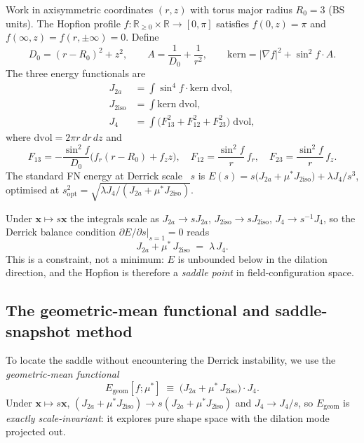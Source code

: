 \documentclass[11pt,a4paper]{article}
\theoremstyle{definition}
\theoremstyle{remark}
\newcommand{\ms}{\mu^{*}}
\newcommand{\lam}{\lambda}
\newcommand{\Ja}{J_{2a}}
\newcommand{\Jiso}{J_{2\mathrm{iso}}}
\newcommand{\Jfour}{J_{4}}
\newcommand{\sopt}{s_{\mathrm{opt}}}
\begin{document}
Work in axisymmetric coordinates $(r,z)$ with torus major radius $R_0 = 3$
(BS units).  The Hopfion profile $f : \mathbb{R}_{\geq0}\times\mathbb{R}\to[0,\pi]$
satisfies $f(0,z)=\pi$ and $f(\infty,z)=f(r,\pm\infty)=0$.  Define
\begin{equation}
  D_0 = (r-R_0)^2 + z^2, \qquad
  A   = \frac{1}{D_0} + \frac{1}{r^2}, \qquad
  \mathrm{kern} = |\nabla f|^2 + \sin^2\!f\cdot A.
  \label{P1:eq:kern}
\end{equation}
The three energy functionals are
\begin{align}
  \Ja   &= \int \sin^4\!f\cdot\mathrm{kern}\;\mathrm{dvol},
           \label{P1:eq:J2a} \\
  \Jiso &= \int \mathrm{kern}\;\mathrm{dvol},
           \label{P1:eq:Jiso} \\
  \Jfour &= \int \bigl(F_{13}^2 + F_{12}^2 + F_{23}^2\bigr)\;\mathrm{dvol},
           \label{P1:eq:J4}
\end{align}
where $\mathrm{dvol} = 2\pi r\,dr\,dz$ and
\begin{equation}
  F_{13} = -\frac{\sin^2\!f}{D_0}\bigl(f_r(r-R_0)+f_z z\bigr),
  \quad
  F_{12} = \frac{\sin^2\!f}{r}\,f_r,
  \quad
  F_{23} = \frac{\sin^2\!f}{r}\,f_z.
\end{equation}
The standard FN energy at Derrick scale~\cite{Derrick1964} $s$ is
$E(s) = s\bigl(\Ja + \ms\Jiso\bigr) + \lam \Jfour/s^3$,
optimised at $\sopt^{2} = \sqrt{\lam\Jfour/(\Ja+\ms\Jiso)}$.

Under $\mathbf{x}\mapsto s\mathbf{x}$ the integrals scale as
$\Ja\to s\Ja$, $\Jiso\to s\Jiso$, $\Jfour\to s^{-1}\Jfour$, so the
Derrick balance condition $\partial E/\partial s|_{s=1}=0$ reads
\begin{equation}
  \Ja + \ms\,\Jiso \;=\; \lam\,\Jfour.
  \label{P1:eq:derrick}
\end{equation}
This is a constraint, not a minimum: $E$ is unbounded below in the
dilation direction, and the Hopfion is therefore a \emph{saddle point}
in field-configuration space.

\subsection{The geometric-mean functional and saddle-snapshot method}
\label{P1:sec:egeom}

To locate the saddle without encountering the Derrick instability, we
use the \emph{geometric-mean functional}
\begin{equation}
  E_{\mathrm{geom}}[f;\ms]
  \;\equiv\; \bigl(\Ja + \ms\,\Jiso\bigr)\cdot\Jfour.
  \label{P1:eq:Egeom}
\end{equation}
Under $\mathbf{x}\mapsto s\mathbf{x}$,
$(\Ja+\ms\Jiso)\to s(\Ja+\ms\Jiso)$ and $\Jfour\to\Jfour/s$, so
$E_{\mathrm{geom}}$ is \emph{exactly scale-invariant}: it explores pure
shape space with the dilation mode projected out.
\end{document}
